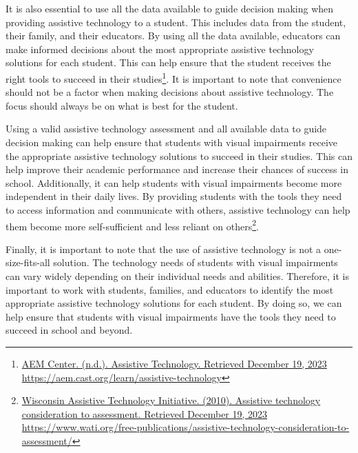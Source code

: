 \documentclass[12pt,letterpaper,twoside]{extreport}
\begin{document}
\begin{appendices}
It is also essential to use all the data available to guide decision making when providing assistive technology to a student. This includes data from the student, their family, and their educators. By using all the data available, educators can make informed decisions about the most appropriate assistive technology solutions for each student. This can help ensure that the student receives the right tools to succeed in their studies\footnote{\raggedright \href{https://aem.cast.org/learn/assistive-technology}{AEM Center. (n.d.). Assistive Technology. Retrieved December 19, 2023} \url{https://aem.cast.org/learn/assistive-technology}}. It is important to note that convenience should not be a factor when making decisions about assistive technology. The focus should always be on what is best for the student.

Using a valid assistive technology assessment and all available data to guide decision making can help ensure that students with visual impairments receive the appropriate assistive technology solutions to succeed in their studies. This can help improve their academic performance and increase their chances of success in school. Additionally, it can help students with visual impairments become more independent in their daily lives. By providing students with the tools they need to access information and communicate with others, assistive technology can help them become more self-sufficient and less reliant on others\footnote{\raggedright \href{https://www.wati.org/free-publications/assistive-technology-consideration-to-assessment/}{Wisconsin Assistive Technology Initiative. (2010). Assistive technology consideration to assessment. Retrieved December 19, 2023} \url{https://www.wati.org/free-publications/assistive-technology-consideration-to-assessment/}}.

Finally, it is important to note that the use of assistive technology is not a one-size-fits-all solution. The technology needs of students with visual impairments can vary widely depending on their individual needs and abilities. Therefore, it is important to work with students, families, and educators to identify the most appropriate assistive technology solutions for each student. By doing so, we can help ensure that students with visual impairments have the tools they need to succeed in school and beyond.


\end{appendices}
\end{document}
